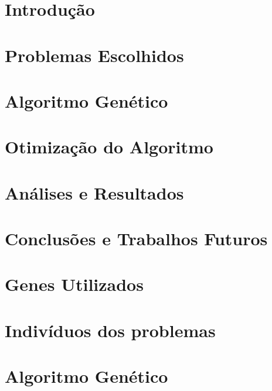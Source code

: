 \documentclass[12pt,plainheader,pnumplain]{abnt}
\newcommand{\oes}{\~oes }
\newcommand{\cao}{\c c\~ao }
\newcommand{\src}{src/experiments}
\begin{document}
\chapter{Introdu\cao}


\chapter{Problemas Escolhidos}


\chapter{Algoritmo Gen\'etico}


\chapter{Otimização do Algoritmo}


\chapter{An\'alises e Resultados}


\chapter{Conclus\oes e Trabalhos Futuros}





\appendix

\newpage
\chapter{Genes Utilizados}
\label{appendix:genes}


\newpage
\chapter{Indivíduos dos problemas}
\label{appendix:genes}


\newpage
\chapter{Algoritmo Genético}
\label{appendix:geneflow}

\end{document}

